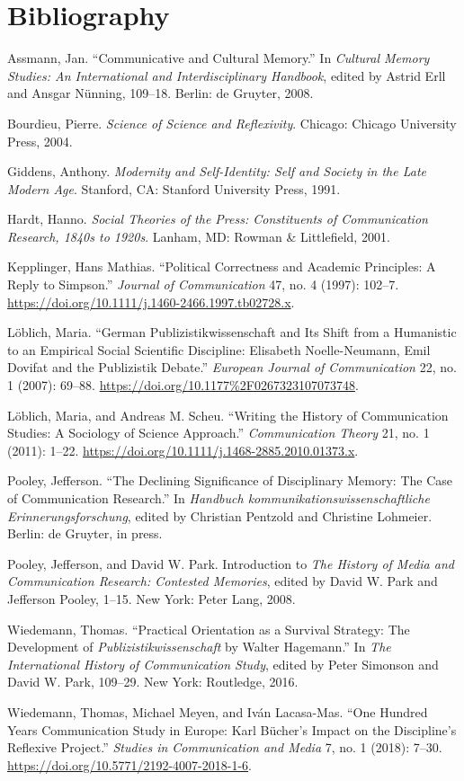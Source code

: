 \documentclass{tufte-handout}
\begin{document}
\section{Bibliography}\label{bibliography}

\begin{hangparas}{.25in}{1} 



Assmann, Jan. ``Communicative and Cultural Memory.'' In \emph{Cultural
Memory Studies: An International and Interdisciplinary Handbook}, edited
by Astrid Erll and Ansgar Nünning, 109--18. Berlin: de Gruyter, 2008.

Bourdieu, Pierre. \emph{Science of Science and Reflexivity}. Chicago:
Chicago University Press, 2004.

Giddens, Anthony. \emph{Modernity and Self-Identity: Self and Society in
the Late Modern Age}. Stanford, CA: Stanford University Press, 1991.

Hardt, Hanno. \emph{Social Theories of the Press: Constituents of
Communication Research, 1840s to 1920s}. Lanham, MD: Rowman \&
Littlefield, 2001.

Kepplinger, Hans Mathias. ``Political Correctness and Academic
Principles: A Reply to Simpson.'' \emph{Journal of Communication} 47,
no. 4 (1997): 102--7.
\url{https://doi.org/10.1111/j.1460-2466.1997.tb02728.x}.

Löblich, Maria. ``German Publizistikwissenschaft and Its Shift from a
Humanistic to an Empirical Social Scientific Discipline: Elisabeth
Noelle-Neumann, Emil Dovifat and the Publizistik Debate.''
\emph{European Journal of Communication} 22, no. 1 (2007): 69--88.
\url{https://doi.org/10.1177\%2F0267323107073748}.

Löblich, Maria, and Andreas M. Scheu. ``Writing the History of
Communication Studies: A Sociology of Science Approach.''
\emph{Communication Theory} 21, no. 1 (2011): 1--22.
\url{https://doi.org/10.1111/j.1468-2885.2010.01373.x}.

Pooley, Jefferson. ``The Declining Significance of Disciplinary Memory:
The Case of Communication Research.'' In \emph{Handbuch
kommunikationswissenschaftliche Erinnerungsforschung}, edited by
Christian Pentzold and Christine Lohmeier. Berlin: de Gruyter, in press.

Pooley, Jefferson, and David W. Park. Introduction to \emph{The History
of Media and Communication Research: Contested Memories}, edited by
David W. Park and Jefferson Pooley, 1--15. New York: Peter Lang, 2008.

Wiedemann, Thomas. ``Practical Orientation as a Survival Strategy: The
Development of \emph{Publizistikwissenschaft} by Walter Hagemann.'' In
\emph{The International History of Communication Study}, edited by Peter
Simonson and David W. Park, 109--29. New York: Routledge, 2016.

Wiedemann, Thomas, Michael Meyen, and Iván Lacasa-Mas. ``One Hundred
Years Communication Study in Europe: Karl Bücher's Impact on the
Discipline's Reflexive Project.'' \emph{Studies in Communication and
Media} 7, no. 1 (2018): 7--30.
\href{http://dx.doi.org/10.5771/2192-4007-2018-1-6}{https://doi.org/10.5771/2192-4007-2018-1-6}.



\end{hangparas}
\end{document}
